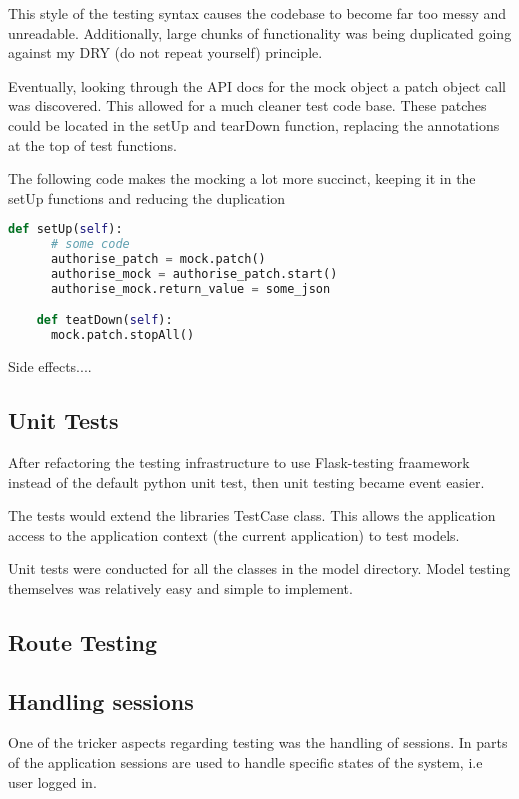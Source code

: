 This style of the testing syntax causes the codebase to become far too messy and unreadable. Additionally, large chunks of functionality was being duplicated going against my DRY (do not repeat yourself) principle.

Eventually, looking through the API docs for the mock object a patch object call was discovered. This allowed for a much cleaner test code base. These patches could be located in the setUp and tearDown function, replacing the annotations at the top of test functions.

The following code makes the mocking a lot more succinct, keeping it in the setUp functions and reducing the duplication

\begin{lstlisting}[language=python]
    def setUp(self):
      # some code
      authorise_patch = mock.patch()
      authorise_mock = authorise_patch.start()
      authorise_mock.return_value = some_json

    def teatDown(self):
      mock.patch.stopAll()
\end{lstlisting}

Side effects....

\subsection{Unit Tests}
After refactoring the testing infrastructure to use Flask-testing fraamework instead of the default python unit test, then unit testing became event easier.

The tests would extend the libraries TestCase class. This allows the application access to the application context (the current application) to test models.

Unit tests were conducted for all the classes in the model directory. Model testing themselves was relatively easy and simple to implement.

\subsection{Route Testing}

\subsection{Handling sessions}
One of the tricker aspects regarding testing was the handling of sessions. In parts of the application sessions are used to handle specific states of the system, i.e user logged in.

